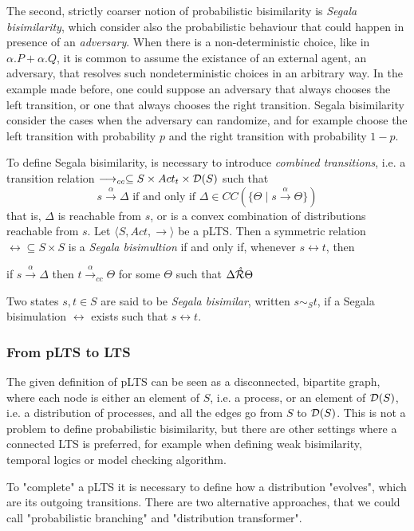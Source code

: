 The second, strictly coarser notion of probabilistic bisimilarity is \textit{Segala bisimilarity}, which consider also the probabilistic behaviour that could happen in presence of an \textit{adversary}. When there is a non-deterministic choice, like in $\alpha.P + \alpha.Q$, it is common to assume the existance of an external agent, an adversary, that resolves such nondeterministic choices in an arbitrary way. In the example made before, one could suppose an adversary that always chooses the left transition, or one that always chooses the right transition. Segala bisimilarity consider the cases when the adversary can randomize, and for example choose the left transition with probability $p$ and the right transition with probability $1-p$.

To define Segala bisimilarity, is necessary to introduce \textit{combined transitions}, i.e. a transition relation $\longrightarrow_{cc} \subseteq S \times Act_t \times \mathcal{D}(S)$ such that 
\[ s \xrightarrow{\alpha} \Delta \text{ if and only if } \Delta \in CC(\big\{\Theta \mid s \xrightarrow{\alpha} \Theta \big\})
\]
that is, $\Delta$ is reachable from $s$, or is a convex combination of distributions reachable from $s$.
Let $\langle S , Act, \rightarrow \rangle$ be a pLTS. Then a symmetric relation $\rel \subseteq S \times S$ is a \textit{Segala bisimultion} if and only if, whenever $s \rel t$, then 
\begin{center}
if $s \xrightarrow{\alpha} \Delta$ then $t \xrightarrow{\alpha}_{cc} \Theta$ for some $\Theta$ such that $\Delta \mathring{\mathcal{R}} \Theta$
\end{center}
Two states $s, t \in S$ are said to be \textit{Segala bisimilar}, written $s \sim_S t$, if a Segala bisimulation $\rel$ exists such that $s \rel t$.
\subsubsection{From pLTS to LTS}

The given definition of pLTS can be seen as a disconnected, bipartite graph, where each node is either an element of $S$, i.e. a process, or an element of $\mathcal{D}(S)$, i.e. a distribution of processes, and all the edges go from $S$ to $\mathcal{D}(S)$. This is not a problem to define probabilistic bisimilarity, but there are other settings where a connected LTS is preferred, for example when defining weak bisimilarity, temporal logics or model checking algorithm.


To "complete" a pLTS it is necessary to define how a distribution "evolves", which are its outgoing transitions. There are two alternative approaches, that we could call "probabilistic branching" and "distribution transformer".

